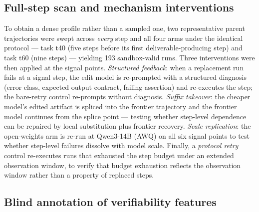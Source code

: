 \subsection*{Full-step scan and mechanism interventions}

To obtain a dense profile rather than a sampled one, two representative parent trajectories were swept across \emph{every} step and all four arms under the identical protocol --- task t40 (five steps before its first deliverable-producing step) and task t60 (nine steps) --- yielding 193 sandbox-valid runs. Three interventions were then applied at the signal points. \emph{Structured feedback}: when a replacement run fails at a signal step, the edit model is re-prompted with a structured diagnosis (error class, expected output contract, failing assertion) and re-executes the step; the bare-retry control re-prompts without diagnosis. \emph{Suffix takeover}: the cheaper model's edited artifact is spliced into the frontier trajectory and the frontier model continues from the splice point --- testing whether step-level dependence can be repaired by local substitution plus frontier recovery. \emph{Scale replication}: the open-weights arm is re-run at Qwen3-14B (AWQ) on all six signal points to test whether step-level failures dissolve with model scale. Finally, a \emph{protocol retry} control re-executes runs that exhausted the step budget under an extended observation window, to verify that budget exhaustion reflects the observation window rather than a property of replaced steps.

\subsection*{Blind annotation of verifiability features}

